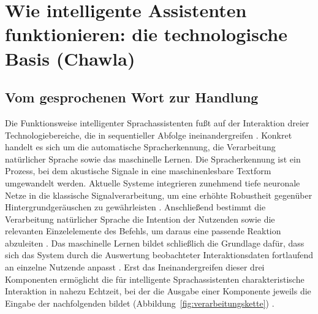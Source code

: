 \section{Wie intelligente Assistenten funktionieren: die technologische Basis (Chawla)}
\label{sec:grundlagen}

\subsection{Vom gesprochenen Wort zur Handlung}
Die Funktionsweise intelligenter Sprachassistenten fußt auf der Interaktion dreier Technologiebereiche, die in sequentieller Abfolge ineinandergreifen \cite{Sarikaya2017}. Konkret handelt es sich um die automatische Spracherkennung, die Verarbeitung natürlicher Sprache sowie das maschinelle Lernen. Die Spracherkennung ist ein Prozess, bei dem akustische Signale in eine maschinenlesbare Textform umgewandelt werden. Aktuelle Systeme integrieren zunehmend tiefe neuronale Netze in die klassische Signalverarbeitung, um eine erhöhte Robustheit gegenüber Hintergrundgeräuschen zu gewährleisten \cite{HaebUmbach2019}. Anschließend bestimmt die Verarbeitung natürlicher Sprache die Intention der Nutzenden sowie die relevanten Einzelelemente des Befehls, um daraus eine passende Reaktion abzuleiten \cite{weld2022survey}. Das maschinelle Lernen bildet schließlich die Grundlage dafür, dass sich das System durch die Auswertung beobachteter Interaktionsdaten fortlaufend an einzelne Nutzende anpasst \cite{kocaballi2019personalization}. Erst das Ineinandergreifen dieser drei Komponenten ermöglicht die für intelligente Sprachassistenten charakteristische Interaktion in nahezu Echtzeit, bei der die Ausgabe einer Komponente jeweils die Eingabe der nachfolgenden bildet (Abbildung~\ref{fig:verarbeitungskette}) \cite{Sarikaya2017}.


